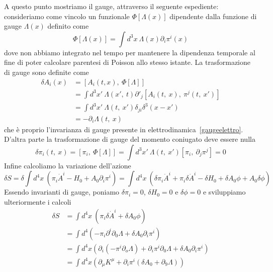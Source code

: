     A questo punto mostriamo il gauge, attraverso il seguente espediente: consideriamo come vincolo un funzionale $\Phi[\Lambda(x)]$ dipendente dalla funzione di gauge $\Lambda(x)$ definito come
\begin{equation*}
    \Phi[\Lambda(x)] = \int d^3 x ~ \Lambda(x) \partial_i \pi^i(x)
\end{equation*}
    dove non abbiamo integrato nel tempo per mantenere la dipendenza temporale al fine di poter calcolare parentesi di Poisson allo stesso istante. La trasformazione di gauge sono definite come 
\begin{equation*}
\begin{aligned}
    \delta A_i (x) & = [A_i(t, x), ~\Phi[\Lambda]] \\ & = \int d^3 x' ~ \Lambda(x', ~t) \partial'_j [A_i(t, ~x), ~ \pi^j(t, ~x')] \\ & = \int d^3 x' ~ \Lambda(t, ~x') \delta_{ji} \delta^3 (x-x') \\ & = - \partial_i \Lambda(t, ~x)
\end{aligned}
\end{equation*}
    che è proprio l'invarianza di gauge presente in elettrodinamica~\eqref{gaugeelettro}. D'altra parte la trasformazione di gauge del momento coniugato deve essere nulla 
\begin{equation*}
    \delta \pi_i(t, ~x) = [\pi_i, ~\Phi[\Lambda]] = \int d^3 x' ~ \Lambda(t, ~x')[\pi_i, ~\partial_j \pi^j] = 0
\end{equation*}
    Infine calcoliamo la variazione dell'azione 
\begin{equation*}
    \delta S = \delta \int d^4 x ~ ( \pi_i \dot A^i - H_0 + A_0 \partial_i \pi^i) = \int d^4 x ~ ( \delta \pi_i \dot A^i + \pi_i \delta \dot A^i - \delta H_0 + \delta A_0 \phi + A_0 \delta \phi )
\end{equation*}
    Essendo invarianti di gauge, poniamo $\delta \pi_i = 0$, $\delta H_0 = 0$ e $\delta \phi = 0$ e sviluppiamo ulteriormente i calcoli
\begin{equation*}
\begin{aligned}
    \delta S & = \int d^4 x ~ (\pi_i \delta \dot A^i + \delta A_0 \phi) \\ & = \int d^4 (-\pi_i\partial^i \partial_0 \Lambda + \delta A_0 \partial_i \pi^i ) \\ & = \int d^4 x (\partial_i (-\pi^i \partial_o \Lambda) + \partial_i \pi^i \partial_0 \Lambda + \delta A_0 \partial_i \pi^i ) \\ & = \int d^4 x (\partial_\mu K^\mu + \partial_i \pi^i (\delta A_0 + \partial_9 \Lambda))
\end{aligned}
\end{equation*}
